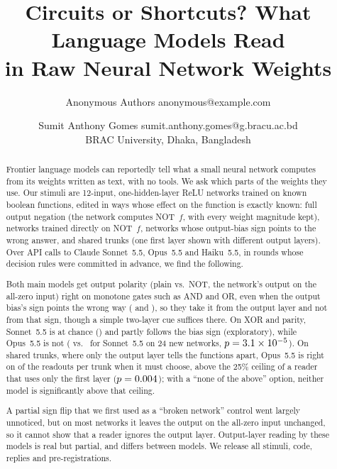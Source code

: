 \documentclass[10pt]{article}
\title{Circuits or Shortcuts? What Language Models Read\\ in Raw Neural Network Weights}
\author{\name Anonymous Authors \email anonymous@example.com}
\author{\name Sumit Anthony Gomes \email sumit.anthony.gomes@g.bracu.ac.bd \\
          \addr BRAC University, Dhaka, Bangladesh}
\newcommand{\Sonnet}{Sonnet~5.5}
\newcommand{\Opus}{Opus~5.5}
\newcommand{\Haiku}{Haiku~5.5}
\begin{document}
\maketitle

\begin{abstract}
Frontier language models can reportedly tell what a small neural network computes from its weights written as text, with no tools. We ask which parts of the weights they use. Our stimuli are 12-input, one-hidden-layer ReLU networks trained on known boolean functions, edited in ways whose effect on the function is exactly known: full output negation (the network computes NOT~$f$, with every weight magnitude kept), networks trained directly on NOT~$f$, networks whose output-bias sign points to the wrong answer, and shared trunks (one first layer shown with different output layers). Over \nRFiveTotalCalls{} API calls to Claude \Sonnet, \Opus{} and \Haiku, in rounds whose decision rules were committed in advance, we find the following.

Both main models get output polarity (plain vs.\ NOT, the network's output on the all-zero input) right on monotone gates such as AND and OR, even when the output bias's sign points the wrong way (\nRFiveSonCuePol{} and \nRFiveOpusCuePol), so they take it from the output layer and not from that sign, though a simple two-layer cue suffices there. On XOR and parity, \Sonnet{} is at chance (\nSonXLPolPct) and partly follows the bias sign (exploratory), while \Opus{} is not (\nFThreeOpus{} vs.\ \nFThreeSon{} for \Sonnet{} on 24 new networks, $p=3.1 \times 10^{-5}$). On shared trunks, where only the output layer tells the functions apart, \Opus{} is right on \nRFiveTrMean{} of the readouts per trunk when it must choose, above the 25\% ceiling of a reader that uses only the first layer ($p=0.004$); with a ``none of the above'' option, neither model is significantly above that ceiling.

A partial sign flip that we first used as a ``broken network'' control went largely unnoticed, but on most networks it leaves the output on the all-zero input unchanged, so it cannot show that a reader ignores the output layer. Output-layer reading by these models is real but partial, and differs between models. We release all stimuli, code, replies and pre-registrations.
\end{abstract}
\end{document}
